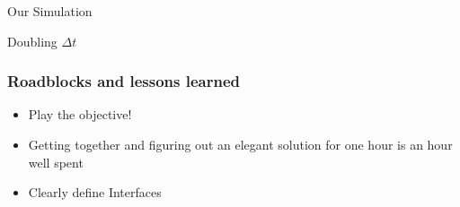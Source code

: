 \begin{frame}{Our Simulation}
	\begin{figure}[h!]
		\centering    
	\end{figure} 
\end{frame}

\begin{frame}{Doubling $\Delta t$}
	\begin{figure}[h!]
		\centering    
	\end{figure} 
\end{frame}

\begin{frame}
	\frametitle{Roadblocks and lessons learned}
	\large
	\begin{itemize}
		\item Play the objective!
		\item Getting together and figuring out an elegant solution for one hour is an hour well spent
		\item Clearly define Interfaces
	\end{itemize}
\end{frame}

\begin{frame}
	\PraesentationBildUhrenturm
\end{frame}

